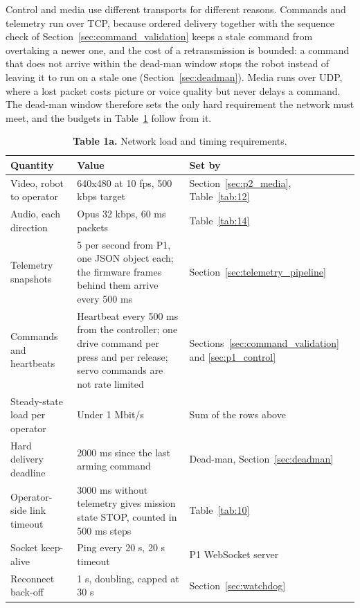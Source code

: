Control and media use different transports for different reasons. Commands and telemetry run over TCP, because ordered delivery together with the sequence check of Section~\ref{sec:command_validation} keeps a stale command from overtaking a newer one, and the cost of a retransmission is bounded: a command that does not arrive within the dead-man window stops the robot instead of leaving it to run on a stale one (Section~\ref{sec:deadman}). Media runs over UDP, where a lost packet costs picture or voice quality but never delays a command. The dead-man window therefore sets the only hard requirement the network must meet, and the budgets in Table~\ref{tab:1a} follow from it.

\begin{table}[!t]
\centering
\caption*{\textbf{Table 1a.} Network load and timing requirements.}
\label{tab:1a}
\begin{tabularx}{\linewidth}{p{4cm} X p{3.2cm}}
\toprule
Quantity & Value & Set by \\
\midrule
Video, robot to operator & 640x480 at 10 fps, 500 kbps target & Section~\ref{sec:p2_media}, Table~\ref{tab:12} \\
Audio, each direction & Opus 32 kbps, 60 ms packets & Table~\ref{tab:14} \\
Telemetry snapshots & 5 per second from P1, one JSON object each; the firmware frames behind them arrive every 500 ms & Section~\ref{sec:telemetry_pipeline} \\
Commands and heartbeats & Heartbeat every 500 ms from the controller; one drive command per press and per release; servo commands are not rate limited & Sections~\ref{sec:command_validation} and \ref{sec:p1_control} \\
Steady-state load per operator & Under 1 Mbit/s & Sum of the rows above \\
Hard delivery deadline & 2000 ms since the last arming command & Dead-man, Section~\ref{sec:deadman} \\
Operator-side link timeout & 3000 ms without telemetry gives mission state STOP, counted in 500 ms steps & Table~\ref{tab:10} \\
Socket keep-alive & Ping every 20 s, 20 s timeout & P1 WebSocket server \\
Reconnect back-off & 1 s, doubling, capped at 30 s & Section~\ref{sec:watchdog} \\
\bottomrule
\end{tabularx}
\end{table}

